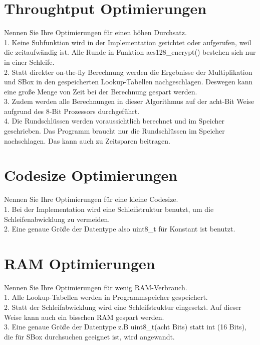 \documentclass[abstract,bibliography=totocnumbered,listof=leveldown,open=any,titlepage]{scrreprt}
\begin{document}
		\section{Throughtput Optimierungen}
	
		Nennen Sie Ihre Optimierungen für einen höhen Durchsatz.\vspace{3mm} \\
		1. Keine Subfunktion wird in der Implementation gerichtet oder aufgerufen, weil die zeitaufwändig ist. Alle Runde in Funktion aes128\_encrypt() bestehen sich nur in einer Schleife. \\
		2. Statt direkter on-the-fly Berechnung werden die Ergebnisse der Multiplikation und SBox in den gespeicherten Lookup-Tabellen nachgeschlagen. Deswegen kann eine große Menge von Zeit bei der Berechnung gespart werden.\\
		3. Zudem werden alle Berechnungen in dieser Algorithmus auf der acht-Bit Weise aufgrund des 8-Bit Prozessors durchgeführt. \\
		4. Die Rundschlüssen werden voraussichtlich berechnet und im Speicher geschrieben. Das Programm braucht nur die Rundschlüssen im Speicher nachschlagen. Das kann auch zu Zeitsparen beitragen. 
	
		\section{Codesize Optimierungen}
	
		Nennen Sie Ihre Optimierungen für eine kleine Codesize.\vspace{3mm}\\
		1. Bei der Implementation wird eine Schleifstruktur benutzt, um die Schleifenabwicklung zu vermeiden.\\
		2. Eine genaue Größe der Datentype also uint8\_t für Konstant ist benutzt.		
	
		\section{RAM Optimierungen}
	
		Nennen Sie Ihre Optimierungen für wenig RAM-Verbrauch.\vspace{3mm}\\
		1. Alle Lookup-Tabellen werden in Programmspeicher gespeichert.\\
		2. Statt der Schleifabwicklung wird eine Schleifstruktur eingesetzt. Auf dieser Weise kann auch ein bisschen RAM gespart werden. \\
		3. Eine genaue Größe der Datentype z.B uint8\_t(acht Bits) statt int (16 Bits), die für SBox  durchsuchen geeignet ist, wird angewandt.
		
\end{document}
